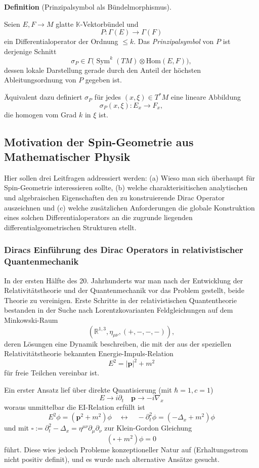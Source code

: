\documentclass[10pt, letterpaper]{article}
\newcommand{\Hom}{\mathrm{Hom}}
\newcommand{\CustomHeading}[3]{%
  \par\medskip\noindent%
  \textbf{#1 #2} \textnormal{(#3)}.\enskip%
}
\newenvironment{DEF}[2]{\CustomHeading{Definition}{#1}{#2}}{}
\begin{document}
\begin{DEF}{}{Prinzipalsymbol als Bündelmorphismus}
Seien \(E,F\to M\) glatte \(\mathbb{K}\)-Vektorbündel und
\[
P:\Gamma(E)\to \Gamma(F)
\]
ein Differentialoperator der Ordnung \(\le k\). Das \emph{Prinzipalsymbol} von \(P\)
ist derjenige Schnitt
\[
\sigma_P\in \Gamma\bigl(\operatorname{Sym}^k(TM)\otimes \Hom(E,F)\bigr),
\]
dessen lokale Darstellung gerade durch den Anteil der höchsten Ableitungsordnung
von \(P\) gegeben ist.

Äquivalent dazu definiert \(\sigma_P\) für jedes \((x,\xi)\in T^*M\) eine lineare
Abbildung
\[
\sigma_P(x,\xi):E_x\to F_x,
\]
die homogen vom Grad \(k\) in \(\xi\) ist.
\end{DEF}




\pagebreak


\subsection{Motivation der Spin-Geometrie aus Mathematischer Physik}


Hier sollen drei Leitfragen addressiert werden: (a) Wieso man sich überhaupt für Spin-Geometrie interessieren sollte, (b) welche charakterisitischen analytischen und algebraischen Eigenschaften den zu konstruierende Dirac Operator auszeichnen und (c) welche zusätzlichen Anforderungen die globale Konstruktion eines solchen Differentialoperators an die zugrunde liegenden differentialgeometrischen Strukturen stellt. 



\subsubsection{Diracs Einführung des Dirac Operators in relativistischer Quantenmechanik}

In der ersten Hälfte des 20. Jahrhunderts war man nach der Entwicklung der Relativitätstheorie und der Quantenmechanik vor das Problem gestellt, beide Theorie zu vereinigen. Erste Schritte in der relativistischen Quantentheorie bestanden in der Suche nach Lorentzkovarianten Feldgleichungen auf dem Minkowski-Raum
$$\left(\mathbb{R}^{1,3}, \eta_{\mu \nu},(+,-,-,-)\right),$$
deren Lösungen eine Dynamik beschreiben, die mit der aus der speziellen Relativitätstheorie bekannten Energie-Impuls-Relation
$$E^2=|\mathbf{p}|^2+m^2$$
für freie Teilchen vereinbar ist.

Ein erster Ansatz lief über direkte Quantisierung (mit $\hbar=1, c=1$)
$$E\to i\partial_t \quad \mathbf{p}\to -i\nabla_x$$
woraus unmittelbar die EI-Relation erfüllt ist 
$$E^2\phi=(\mathbf{p}^2+m^2)\phi \quad \longleftrightarrow \quad -\partial_t^2\phi=(-\Delta_x+m^2)\phi$$
und mit $\square:=\partial_t^2-\Delta_x=\eta^{\mu\nu}\partial_\mu\partial_\nu$ zur Klein-Gordon Gleichung
$$(\square +m^2)\phi=0$$
führt. Diese wies jedoch Probleme konzeptioneller Natur auf (Erhaltungsstrom nicht positiv definit), und es wurde nach alternative Ansätze gesucht. 
\end{document}
